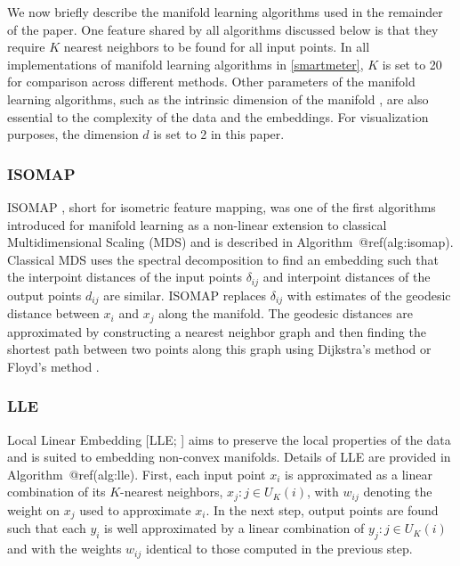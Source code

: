 \documentclass{article}
\begin{document}
We now briefly describe the manifold learning algorithms used in the
remainder of the paper. One feature shared by all algorithms discussed
below is that they require \(K\) nearest neighbors to be found for all
input points. In all implementations of manifold learning algorithms in
\autoref{smartmeter}, \(K\) is set to 20 for comparison across different
methods. Other parameters of the manifold learning algorithms, such as
the intrinsic dimension of the manifold \citep{Denti2021-jl}, are also
essential to the complexity of the data and the embeddings. For
visualization purposes, the dimension \(d\) is set to 2 in this paper.

\hypertarget{isomap}{%
\subsubsection*{ISOMAP}\label{isomap}}

ISOMAP \citep{Tenenbaum2000-fr}, short for isometric feature mapping,
was one of the first algorithms introduced for manifold learning as a
non-linear extension to classical Multidimensional Scaling (MDS) and is
described in Algorithm~@ref(alg:isomap). Classical MDS uses the spectral
decomposition to find an embedding such that the interpoint distances of
the input points \(\delta_{ij}\) and interpoint distances of the output
points \(d_{ij}\) are similar. ISOMAP replaces \(\delta_{ij}\) with
estimates of the geodesic distance between \(x_i\) and \(x_j\) along the
manifold. The geodesic distances are approximated by constructing a
nearest neighbor graph and then finding the shortest path between two
points along this graph using Dijkstra's method \citep{Dijkstra1959-ml}
or Floyd's method \citep{Floyd1962-hx}.

\hypertarget{lle}{%
\subsubsection*{LLE}\label{lle}}

Local Linear Embedding {[}LLE; \citet{Roweis2000-ni}{]} aims to preserve
the local properties of the data and is suited to embedding non-convex
manifolds. Details of LLE are provided in Algorithm~@ref(alg:lle).
First, each input point \(x_i\) is approximated as a linear combination
of its \(K\)-nearest neighbors, \(x_j:j\in U_K(i)\), with \(w_{ij}\)
denoting the weight on \(x_j\) used to approximate \(x_i\). In the next
step, output points are found such that each \(y_i\) is well
approximated by a linear combination of \(y_j:j\in U_K(i)\) and with the
weights \(w_{ij}\) identical to those computed in the previous step.
\end{document}
